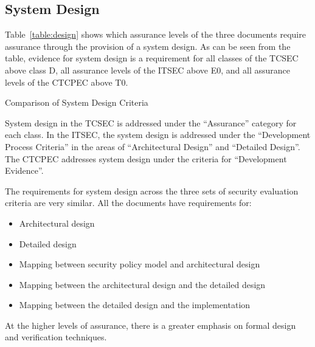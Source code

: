 
    \subsection{System Design} 
    Table~\ref{table:design} shows which assurance levels of the three documents
    require assurance through the provision of a system design. As can be seen
    from the table, evidence for system design is a requirement for all classes
    of the TCSEC above class D, all assurance levels of the ITSEC above E0,
    and all assurance levels of the CTCPEC above T0.
    \begin{table}[H]
    \begin{center}
    \bc
    \ec
    \end{center}
    \caption{Comparison of System Design Criteria} \label{table:design}
    \end{table}
    System design in the TCSEC is addressed under the ``Assurance'' category for each class.
    In the ITSEC, the system design is addressed under the ``Development Process Criteria''
    in the areas of ``Architectural Design'' and ``Detailed Design''. The CTCPEC addresses
    system design under the criteria for ``Development Evidence''.
    
    The requirements for system design across the three sets of security evaluation criteria
    are very similar. All the documents have requirements for:
    \begin{itemize}
        \item Architectural design
        \item Detailed design
        \item Mapping between security policy model and architectural design
        \item Mapping between the architectural design and the detailed design
        \item Mapping between the detailed design and the implementation
    \end{itemize}
    At the higher levels of assurance, there is a greater emphasis on formal design and 
    verification techniques.


